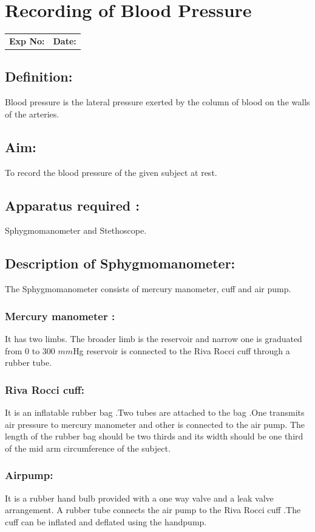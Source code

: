 \documentclass[a4paper,12pt,openany,twoside]{book}
\begin{document}
															\chapter*{\centering Recording of Blood Pressure}
															\begin{tabular}{p{5in} p{1in}}
																\textbf{Exp No:}  & \textbf{Date:}\\
															\end{tabular}
															\section*{Definition:}

															Blood pressure is the lateral pressure exerted by the column of  blood on the walls of the arteries.
															\section*{Aim:}
																
To record the blood pressure of the given subject at rest.
\section*{Apparatus required :}
Sphygmomanometer and Stethoscope.
\section*{Description of Sphygmomanometer:}
The Sphygmomanometer consists of mercury manometer, cuff and air pump.
\subsection*{Mercury manometer :} It has two limbs. The broader limb is the reservoir and narrow one is graduated from 0 to 300 $mm$Hg reservoir is connected to the Riva Rocci cuff through a rubber tube.
\subsection*{Riva Rocci cuff:} It is an inflatable rubber bag .Two tubes are attached to the bag .One transmits air pressure to mercury manometer and other is connected to the air pump. The length of the rubber bag should be two thirds and its width should be one third of the mid arm circumference of the subject.
\subsection*{Airpump:} It is a rubber hand bulb provided with a one way valve and a leak valve arrangement. A rubber tube connects the air pump to the Riva Rocci cuff .The cuff can be inflated and deflated using the handpump.
\end{document}
